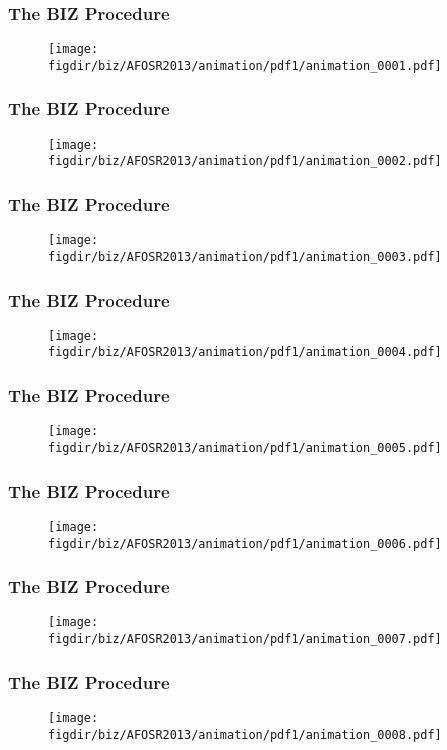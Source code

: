 \documentclass[13pt]{beamer}
\newcommand{\figdir}{../../fig}
\begin{document}
\begin{frame}\frametitle{The BIZ Procedure}\begin{figure}\texttt{[image: \\figdir/biz/AFOSR2013/animation/pdf1/animation\_0001.pdf]}\end{figure}\end{frame}
\begin{frame}\frametitle{The BIZ Procedure}\begin{figure}\texttt{[image: \\figdir/biz/AFOSR2013/animation/pdf1/animation\_0002.pdf]}\end{figure}\end{frame}
\begin{frame}\frametitle{The BIZ Procedure}\begin{figure}\texttt{[image: \\figdir/biz/AFOSR2013/animation/pdf1/animation\_0003.pdf]}\end{figure}\end{frame}
\begin{frame}\frametitle{The BIZ Procedure}\begin{figure}\texttt{[image: \\figdir/biz/AFOSR2013/animation/pdf1/animation\_0004.pdf]}\end{figure}\end{frame}
\begin{frame}\frametitle{The BIZ Procedure}\begin{figure}\texttt{[image: \\figdir/biz/AFOSR2013/animation/pdf1/animation\_0005.pdf]}\end{figure}\end{frame}
\begin{frame}\frametitle{The BIZ Procedure}\begin{figure}\texttt{[image: \\figdir/biz/AFOSR2013/animation/pdf1/animation\_0006.pdf]}\end{figure}\end{frame}
\begin{frame}\frametitle{The BIZ Procedure}\begin{figure}\texttt{[image: \\figdir/biz/AFOSR2013/animation/pdf1/animation\_0007.pdf]}\end{figure}\end{frame}
\begin{frame}\frametitle{The BIZ Procedure}\begin{figure}\texttt{[image: \\figdir/biz/AFOSR2013/animation/pdf1/animation\_0008.pdf]}\end{figure}\end{frame}
\end{document}
